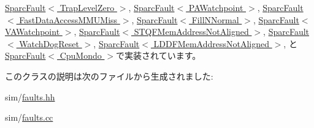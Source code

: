 \hyperlink{classSparcISA_1_1SparcFault_a73adb23259baf912a81683a9790a303f}{SparcFault$<$ TrapLevelZero $>$}, \hyperlink{classSparcISA_1_1SparcFault_a73adb23259baf912a81683a9790a303f}{SparcFault$<$ PAWatchpoint $>$}, \hyperlink{classSparcISA_1_1SparcFault_a73adb23259baf912a81683a9790a303f}{SparcFault$<$ FastDataAccessMMUMiss $>$}, \hyperlink{classSparcISA_1_1SparcFault_a73adb23259baf912a81683a9790a303f}{SparcFault$<$ FillNNormal $>$}, \hyperlink{classSparcISA_1_1SparcFault_a73adb23259baf912a81683a9790a303f}{SparcFault$<$ VAWatchpoint $>$}, \hyperlink{classSparcISA_1_1SparcFault_a73adb23259baf912a81683a9790a303f}{SparcFault$<$ STQFMemAddressNotAligned $>$}, \hyperlink{classSparcISA_1_1SparcFault_a73adb23259baf912a81683a9790a303f}{SparcFault$<$ WatchDogReset $>$}, \hyperlink{classSparcISA_1_1SparcFault_a73adb23259baf912a81683a9790a303f}{SparcFault$<$ LDDFMemAddressNotAligned $>$}, と \hyperlink{classSparcISA_1_1SparcFault_a73adb23259baf912a81683a9790a303f}{SparcFault$<$ CpuMondo $>$}で実装されています。

このクラスの説明は次のファイルから生成されました:\begin{DoxyCompactItemize}
\item 
sim/\hyperlink{sim_2faults_8hh}{faults.hh}\item 
sim/\hyperlink{sim_2faults_8cc}{faults.cc}\end{DoxyCompactItemize}
